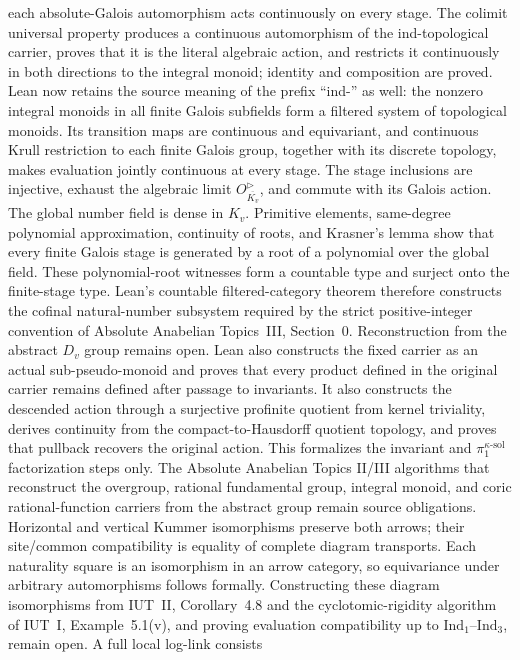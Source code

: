 \documentclass[11pt]{article}
\newcommand{\IndOne}{\ensuremath{\mathrm{Ind}_1}}
\newcommand{\IndThree}{\ensuremath{\mathrm{Ind}_3}}
\theoremstyle{plain}
\theoremstyle{definition}
\theoremstyle{remark}
\begin{document}
each absolute-Galois automorphism acts continuously on every stage.  The
colimit universal property produces a continuous automorphism of the
ind-topological carrier, proves that it is the literal algebraic action, and
restricts it continuously in both directions to the integral monoid; identity
and composition are proved.  Lean now retains the source meaning of the
prefix ``ind-'' as well: the nonzero integral monoids in all finite Galois
subfields form a filtered system of topological monoids.  Its transition maps
are continuous and equivariant, and continuous Krull restriction to each
finite Galois group, together with its discrete topology, makes evaluation
jointly continuous at every stage.  The stage inclusions are injective,
exhaust the algebraic limit \(O_{\overline{K_v}}^\triangleright\), and commute
with its Galois action.  The global number field is dense in \(K_v\).
Primitive elements, same-degree polynomial approximation, continuity of
roots, and Krasner's lemma show that every finite Galois stage is generated
by a root of a polynomial over the global field.  These polynomial-root
witnesses form a countable type and surject onto the finite-stage type.
Lean's countable filtered-category theorem therefore constructs the cofinal
natural-number subsystem required by the strict positive-integer convention
of Absolute Anabelian Topics~III, Section~0.  Reconstruction from the abstract
\(D_v\) group remains open.  Lean also
constructs the fixed carrier as an actual sub-pseudo-monoid and proves that
every product defined in the original carrier remains defined after passage
to invariants.  It also constructs the descended action through a surjective
profinite quotient from kernel triviality, derives continuity from the
compact-to-Hausdorff quotient topology, and proves that pullback recovers the
original action.  This formalizes the invariant and
$\pi_1^{\kappa\text{-sol}}$ factorization steps only.  The Absolute Anabelian
Topics II/III algorithms that reconstruct the overgroup, rational fundamental
group, integral monoid, and coric rational-function carriers from the abstract
group remain source obligations.
Horizontal and vertical Kummer isomorphisms preserve both arrows; their
site/common compatibility is equality of complete diagram transports.  Each
naturality square is an isomorphism in an arrow category, so equivariance under
arbitrary automorphisms follows formally.  Constructing these diagram
isomorphisms from IUT~II, Corollary~4.8 and the cyclotomic-rigidity algorithm
of IUT~I, Example~5.1(v), and proving evaluation compatibility up to
\(\IndOne\)--\(\IndThree\), remain open.  A full local log-link consists
\end{document}
